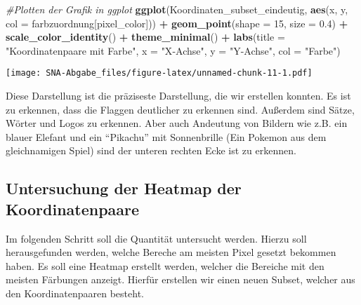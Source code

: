 \documentclass[
]{article}
\newenvironment{Shaded}{\begin{snugshade}}{\end{snugshade}}
\newcommand{\AttributeTok}[1]{\textcolor[rgb]{0.13,0.29,0.53}{#1}}
\newcommand{\CommentTok}[1]{\textcolor[rgb]{0.56,0.35,0.01}{\textit{#1}}}
\newcommand{\DecValTok}[1]{\textcolor[rgb]{0.00,0.00,0.81}{#1}}
\newcommand{\FloatTok}[1]{\textcolor[rgb]{0.00,0.00,0.81}{#1}}
\newcommand{\FunctionTok}[1]{\textcolor[rgb]{0.13,0.29,0.53}{\textbf{#1}}}
\newcommand{\NormalTok}[1]{#1}
\newcommand{\SpecialCharTok}[1]{\textcolor[rgb]{0.81,0.36,0.00}{\textbf{#1}}}
\newcommand{\StringTok}[1]{\textcolor[rgb]{0.31,0.60,0.02}{#1}}
\begin{document}
\begin{Shaded}
\begin{Highlighting}[]
\CommentTok{\#Plotten der Grafik in ggplot}
\FunctionTok{ggplot}\NormalTok{(Koordinaten\_subset\_eindeutig, }\FunctionTok{aes}\NormalTok{(x, y, }\AttributeTok{col =}\NormalTok{ farbzuordnung[pixel\_color])) }\SpecialCharTok{+}
  \FunctionTok{geom\_point}\NormalTok{(}\AttributeTok{shape =} \DecValTok{15}\NormalTok{, }\AttributeTok{size =} \FloatTok{0.4}\NormalTok{) }\SpecialCharTok{+}
  \FunctionTok{scale\_color\_identity}\NormalTok{() }\SpecialCharTok{+}
  \FunctionTok{theme\_minimal}\NormalTok{() }\SpecialCharTok{+}
  \FunctionTok{labs}\NormalTok{(}\AttributeTok{title =} \StringTok{"Koordinatenpaare mit Farbe"}\NormalTok{, }\AttributeTok{x =} \StringTok{"X{-}Achse"}\NormalTok{, }\AttributeTok{y =} \StringTok{"Y{-}Achse"}\NormalTok{, }\AttributeTok{col =} \StringTok{"Farbe"}\NormalTok{)}
\end{Highlighting}
\end{Shaded}

\texttt{[image: SNA-Abgabe\_files/figure-latex/unnamed-chunk-11-1.pdf]}

Diese Darstellung ist die präziseste Darstellung, die wir erstellen
konnten. Es ist zu erkennen, dass die Flaggen deutlicher zu erkennen
sind. Außerdem sind Sätze, Wörter und Logos zu erkennen. Aber auch
Andeutung von Bildern wie z.B. ein blauer Elefant und ein ``Pikachu''
mit Sonnenbrille (Ein Pokemon aus dem gleichnamigen Spiel) sind der
unteren rechten Ecke ist zu erkennen.

\subsection{Untersuchung der Heatmap der
Koordinatenpaare}\label{untersuchung-der-heatmap-der-koordinatenpaare}

Im folgenden Schritt soll die Quantität untersucht werden. Hierzu soll
herausgefunden werden, welche Bereche am meisten Pixel gesetzt bekommen
haben. Es soll eine Heatmap erstellt werden, welcher die Bereiche mit
den meisten Färbungen anzeigt. Hierfür erstellen wir einen neuen Subset,
welcher aus den Koordinatenpaaren besteht.
\end{document}
